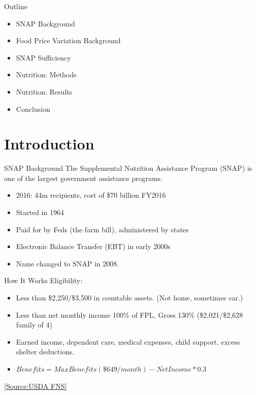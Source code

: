 \documentclass{beamer}
\begin{document}
\begin{frame}{Outline}
\begin{itemize}
\item SNAP Background
\item Food Price Variation Background
\item SNAP Sufficiency
\item Nutrition: Methods
\item Nutrition: Results
\item Conclusion
\end{itemize}
\end{frame}
\section{Introduction}

\begin{frame}{SNAP Background}
The Supplemental Nutrition Assistance Program (SNAP) is one of the largest government assistance programs.
\begin{itemize}
\item
	2016: 44m recipients, cost of \$70 billion FY2016 
	
	\begin{tiny}
\end{tiny}	
\item 
	Started in 1964%
\item 
	Paid for by Feds (the farm bill), administered by states
\item
	Electronic Balance Transfer (EBT) in early 2000s
\item 
	Name changed to SNAP in 2008.
\end{itemize}
\end{frame}

\begin{frame}{How It Works}
Eligibility:
\begin{itemize}
\item Less than \$2,250/\$3,500 in countable assets. (Not home, sometimes car.)
\item Less than net monthly income 100\% of FPL, Gross 130\% (\$2,021/\$2,628 family of 4)
\item Earned income, dependent care, medical expenses, child support, excess shelter deductions.
\item $ Benefits=MaxBenefits(\$649/month)-NetIncome*0.3 $
\end{itemize}
\begin{tiny}
\href{https://www.fns.usda.gov/snap/eligibility}{[Source:USDA FNS]}
\end{tiny}
\end{frame}
\end{document}
